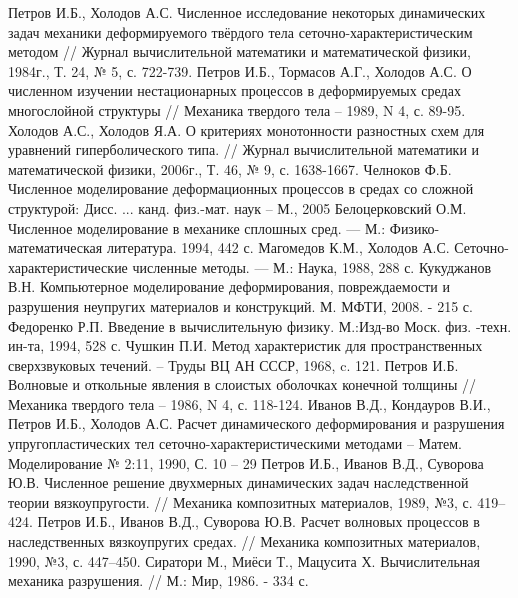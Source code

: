 \begin{thebibliography}{99}

Петров И.Б., Холодов А.С. Численное исследование некоторых динамических задач механики деформируемого твёрдого тела сеточно-характеристическим методом // Журнал вычислительной математики и математической физики, 1984г., Т. 24, № 5, с. 722-739.
Петров  И.Б., Тормасов А.Г., Холодов А.С. О численном изучении нестационарных процессов в деформируемых средах многослойной структуры // Механика твердого тела – 1989, N 4, с. 89-95.
Холодов А.С., Холодов Я.А. О критериях монотонности разностных схем для уравнений гиперболического типа. // Журнал вычислительной математики и математической физики, 2006г., Т. 46, № 9, с. 1638-1667.
Челноков Ф.Б. Численное моделирование деформационных процессов в средах со сложной структурой: Дисс. ... канд. физ.-мат. наук – М., 2005
Белоцерковский О.М. Численное моделирование в механике сплошных сред. — М.: Физико-математическая литература. 1994, 442 с.
Магомедов К.М., Холодов А.С. Сеточно-характеристические численные методы. — М.: Наука, 1988, 288 с.
Кукуджанов В.Н. Компьютерное моделирование деформирования, повреждаемости и разрушения неупругих материалов и конструкций. М. МФТИ, 2008. - 215 с.
Федоренко Р.П. Введение в вычислительную физику. М.:Изд-во Моск. физ. -техн. ин-та, 1994, 528 с.
Чушкин П.И. Метод характеристик для пространственных сверхзвуковых течений. –  Труды ВЦ АН СССР, 1968, c. 121.
Петров И.Б. Волновые и откольные явления в слоистых оболочках конечной толщины // Механика твердого тела – 1986, N 4, с. 118-124.
 Иванов В.Д., Кондауров В.И., Петров И.Б., Холодов А.С. Расчет динамического деформирования и разрушения упругопластических тел сеточно-характеристическими методами – Матем. Моделирование № 2:11, 1990, С. 10 – 29
Петров И.Б., Иванов В.Д., Суворова Ю.В. Численное решение двухмерных динамических задач наследственной теории вязкоупругости. // Механика композитных материалов, 1989, №3, с. 419--424.
Петров И.Б., Иванов В.Д., Суворова Ю.В. Расчет волновых процессов в наследственных вязкоупругих средах. // Механика композитных материалов, 1990, №3, с. 447--450.
Сиратори М., Миёси Т., Мацусита Х. Вычислительная механика разрушения. // М.: Мир, 1986. - 334 с.


\end{thebibliography}
